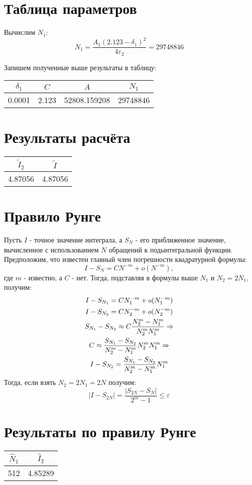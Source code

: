\documentclass[titlepage]{article}
\def\l{\left}
\def\r{\right}
\def\le{\leqslant}
\begin{document}
\section{Таблица параметров}
Вычислим $N_1$:
$$N_1 = \frac{A_1(2.123-\delta_1)^2}{4\varepsilon_2} = 29748846$$

Запишем полученные выше результаты в таблицу:
\begin{center}
	\begin{tabular}{|c|c|c|c|}
		\hline
		$\delta_1$ &  $C$ & $A$ &  $N_1$  \\
		\hline
		0.0001 & 2.123 & 52808.159208 & 29748846 \\
		\hline
	\end{tabular}
\end{center}
\section{Результаты расчёта}
\begin{center}
	\begin{tabular}{|c|c|}
		\hline
		$\tilde I_2$  & $\tilde I$\\
		\hline
		4.87056 & 4.87056 \\
		\hline
	\end{tabular}
\end{center}

\section{Правило Рунге}
Пусть $I$ - точное значение интеграла, а $S_N$ - его приближенное значение, вычисленное с использованием $N$ обращений к подынтегральной функции. Предположим, что известен главный член погрешности квадратурной формулы:
$$I - S_N = CN^{-m} + o(N^{-m}),$$
где $m$ - известно, а $C$ - нет. Тогда, подставляя в формулы выше $N_1$ и $N_2 = 2N_1$, получим:
\begin{gather}
	\notag I - S_{N_1} = CN_1^{-m} + o(N_1^{-m}) \\
	\notag I - S_{N_2} = CN_2^{-m} + o(N_2^{-m}) \\
	\notag S_{N_1} - S_{N_2} \approx C \frac{N_2^m - N_1^m}{N_2^m N_1^m} \Rightarrow \\
	\notag C \approx \frac{S_{N_1} - S_{N_2}}{N_2^m - N_1^m}N_2^m N_1^m \Rightarrow \\
	\notag I - S_{N_2} = \frac{S_{N_1} - S_{N_2}}{N_2^m - N_1^m}N_1^m
\end{gather}
Тогда, если взять $N_2 = 2N_1 = 2N$ получим:
$$\l| I - S_{2N} \r| = \frac{\l| S_{2N} - S_N \r|}{2^m - 1} \le \varepsilon$$

\section{Результаты по правилу Рунге}
\begin{center}
	\begin{tabular}{|c|c|}
		\hline
		$\hat N_1$ & $\hat I_2$  \\
		\hline
		512 & 4.85289  \\
		\hline
	\end{tabular}
\end{center}
\end{document}
